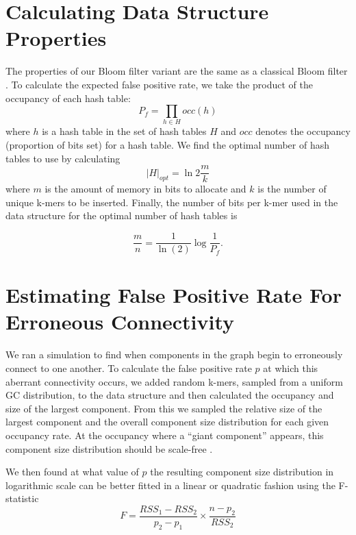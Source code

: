 \documentclass[draft]{pnastwo}
\begin{document}
\begin{article}
\begin{materials}
\section{Calculating Data Structure Properties}
The properties of our Bloom filter variant are the same as a classical
Bloom filter \cite{bloomsurvey}.  To calculate the expected false
positive rate, we take the product of the occupancy of each hash
table:
\begin{displaymath}
P_f = \prod_{h \in H} occ(h)
\end{displaymath}
where $h$ is a hash table in the set of hash tables $H$ and $occ$ denotes
the occupancy (proportion of bits set) for a hash table.
We find the optimal number of hash tables
to use by calculating
\begin{displaymath}
\vert H \vert_{opt} = \ln 2 \frac{m}{k}
\end{displaymath}
where $m$ is the amount of memory in bits to allocate and $k$
is the number of unique k-mers to be inserted. Finally,
the number of bits per
k-mer used in the data structure for the optimal number of hash 
tables is

\begin{displaymath}
\frac{m}{n} = \frac{1}{\ln(2)} \log{\frac{1}{P_f}}.
\end{displaymath}

\section{Estimating False Positive Rate For Erroneous Connectivity}
We ran a simulation to find when components in the graph begin to
erroneously connect to one another.  To calculate the false positive
rate $p$ at which this aberrant connectivity occurs, we added random
k-mers, sampled from a uniform GC distribution, to the data structure
and then calculated the occupancy and size of the largest
component. From this we sampled the relative size of the largest
component and the overall component size distribution for each given
occupancy rate.  At the occupancy where a ``giant component'' appears,
this component size distribution should be scale-free
\cite{stauffer1979scaling}.

We then found at what value of $p$ the resulting component size
distribution in logarithmic scale can be better fitted in a linear or
quadratic fashion using the F-statistic
\newline
\newline
\begin{displaymath}
F=\frac{RSS_1-RSS_2}{p_2-p_1} \times \frac{n - p_2}{RSS_2}
\end{displaymath}


\end{materials}
\end{article}
\end{document}
